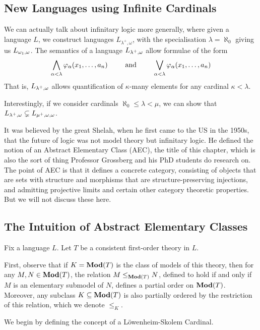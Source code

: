 \subsection{New Languages using Infinite Cardinals}

We can actually talk about infinitary logic more generally, where given a language $L$, we construct languages $L_{\lambda^+, \omega}$, with the specialisation $\lambda = \aleph_0$ giving us $L_{\omega_1, \omega}$. The semantics of a language $L_{\lambda^+, \omega}$ allow formulae of the form
\begin{align*}
    \bigwedge_{\alpha < \lambda} \varphi_{\alpha}\!\left( x_1, \ldots, a_n \right)
    \qquad \text{ and } \qquad
    \bigvee_{\alpha < \lambda} \varphi_{\alpha}\!\left( x_1, \ldots, a_n \right)
\end{align*}
That is, $L_{{\lambda}^{+}, \omega}$ allows quantification of $\kappa$-many elements for any cardinal $\kappa < \lambda$.

Interestingly, if we consider cardinals $\aleph_0 \leq \lambda < \mu$, we can show that $L_{\lambda^+, \omega} \subsetneq L_{\mu^+, \omega, \omega}$.

It was believed by the great Shelah, when he first came to the US in the 1950s, that the future of logic was not model theory but infinitary logic. He defined the notion of an Abstract Elementary Class (AEC), the title of this chapter, which is also the sort of thing Professor Grossberg and his PhD students do research on. The point of AEC is that it defines a concrete category, consisting of objects that are sets with structure and morphisms that are structure-preserving injections, and admitting projective limits and certain other category theoretic properties. But we will not discuss these here.

\subsection{The Intuition of Abstract Elementary Classes}

Fix a language $L$. Let $T$ be a consistent first-order theory in $L$.

First, observe that if $K = \mathbf{Mod}(T)$ is the class of models of this theory, then for any $M, N \in \mathbf{Mod}(T)$, the relation $M \leq_{\mathbf{Mod}(T)} N$, defined to hold if and only if $M$ is an elementary submodel of $N$, defines a partial order on $\mathbf{Mod}(T)$. Moreover, any subclass $K \subseteq \mathbf{Mod}(T)$ is also partially ordered by the restriction of this relation, which we denote $\leq_K$.

We begin by defining the concept of a Löwenheim-Skolem Cardinal.

